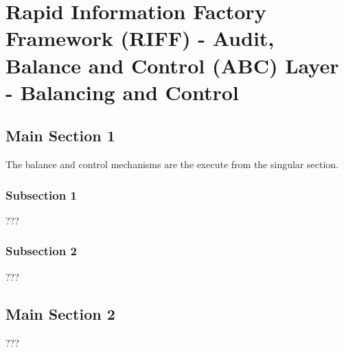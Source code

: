 
\chapter{Rapid Information Factory Framework (RIFF) - Audit, Balance and Control (ABC) Layer - Balancing and Control} %

\label{Chapter32} %



\section{Main Section 1}

The balance and control mechanisms are the execute from the singular section.

\subsection{Subsection 1}

???


\subsection{Subsection 2}

???


\section{Main Section 2}

???
